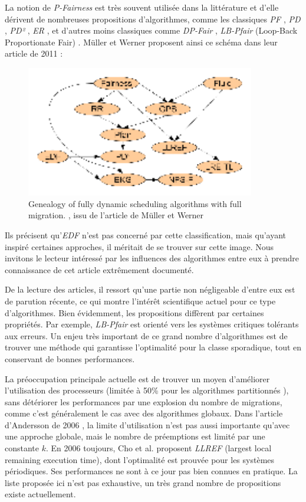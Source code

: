	La notion de \textit{P-Fairness} est très souvent utilisée dans la littérature et d'elle dérivent 
	de nombreuses propositions d'algorithmes, comme les classiques \textit{PF} \cite{baruah_proportionate_1996}, \textit{PD} \cite{baruah_fast_1995}, \textit{PD²} \cite{srinivasan_optimal_2006} , \textit{ER} \cite{anderson_early-release_2000}, 
	et d'autres moins \og classiques\fg{}  comme \textit{DP-Fair} \cite{levin_dp-fair_2010}, 
	\textit{LB-Pfair} (Loop-Back Proportionate Fair) \cite{kramer_proportionate_2015}. 
	Müller et Werner proposent ainsi ce schéma dans leur article de 2011 :\medskip
	\begin{figure}[ht]
		\caption{\og Genealogy of fully dynamic scheduling algorithms with full migration.\fg{} , issu de l'article de Müller et Werner\cite{muller_genealogy_2011}}
		\includegraphics[width=10cm]{img/genealogy_pf}
	\end{figure}
	Ils précisent qu'\textit{EDF} n'est pas concerné par cette classification, mais qu'ayant 
	inspiré certaines approches, il méritait de se trouver sur cette image. 
	Nous invitons le lecteur intéressé par les influences des algorithmes entre eux 
	à prendre connaissance de cet article extrêmement documenté.\medskip
	
	De la lecture des articles, il ressort qu'une partie non négligeable d'entre eux 
	est de parution récente, ce qui montre l'intérêt scientifique actuel pour ce type d'algorithmes. 
	Bien évidemment, les propositions diffèrent par certaines propriétés. Par exemple, 
	\textit{LB-Pfair} est orienté vers les systèmes critiques tolérants aux erreurs. 
	Un enjeu très important de ce grand nombre d'algorithmes est de trouver une méthode qui 
	garantisse l'optimalité pour la classe sporadique, tout en conservant de bonnes performances. 
	
	La préoccupation principale actuelle est de trouver un moyen d'améliorer l'utilisation des processeurs (limitée à 
	50\% pour les algorithmes partitionnés \cite{oh_utilization_1998}), sans détériorer les performances par 
	une explosion du nombre de migrations, comme c'est généralement le cas avec des algorithmes globaux. 
	Dans l'article d'Andersson de 2006 \cite{andersson_multiprocessor_2006}, la limite d'utilisation 
	n'est pas aussi importante qu'avec une approche globale, mais le nombre de préemptions est limité par 
	une constante $k$. En 2006 toujours, Cho et al. \cite{cho_optimal_2006} proposent \textit{LLREF} 
	(largest local remaining execution time), dont l'optimalité est prouvée pour les 
	systèmes périodiques. Ses performances ne sont à ce jour pas bien connues en pratique. 
	La liste proposée ici n'est pas exhaustive, un très grand nombre de propositions existe actuellement. 
	
